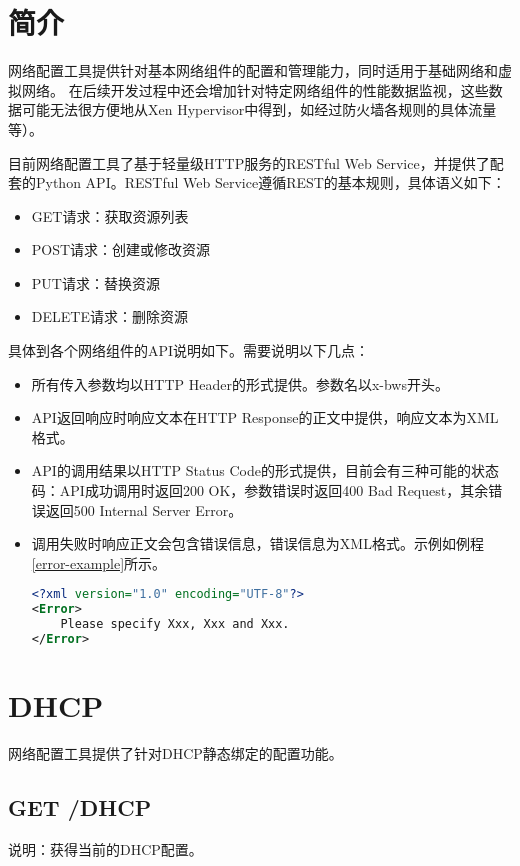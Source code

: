 \section{简介}
网络配置工具提供针对基本网络组件的配置和管理能力，同时适用于基础网络和虚拟网络。
在后续开发过程中还会增加针对特定网络组件的性能数据监视，这些数据可能无法很方便地从Xen Hypervisor中得到，如经过防火墙各规则的具体流量等）。

目前网络配置工具了基于轻量级HTTP服务的RESTful Web Service，并提供了配套的Python API。RESTful Web Service遵循REST的基本规则\cite{fielding2000architectural}，具体语义如下：

\begin{itemize}
\item GET请求：获取资源列表
\item POST请求：创建或修改资源
\item PUT请求：替换资源
\item DELETE请求：删除资源
\end{itemize}

具体到各个网络组件的API说明如下。需要说明以下几点：

\begin{itemize}
\item 所有传入参数均以HTTP Header的形式提供。参数名以x-bws开头。
\item API返回响应时响应文本在HTTP Response的正文中提供，响应文本为XML格式。
\item API的调用结果以HTTP Status Code的形式提供，目前会有三种可能的状态码：API成功调用时返回200 OK，参数错误时返回400 Bad Request，其余错误返回500 Internal Server Error。
\item 调用失败时响应正文会包含错误信息，错误信息为XML格式。示例如例程\ref{error-example}所示。
\begin{lstlisting}[caption=错误信息示例,label=error-example,language=XML]
<?xml version="1.0" encoding="UTF-8"?>
<Error>
	Please specify Xxx, Xxx and Xxx.
</Error>
\end{lstlisting}
\end{itemize}

\section{DHCP}
网络配置工具提供了针对DHCP静态绑定的配置功能。

\subsection{GET /DHCP}
说明：获得当前的DHCP配置。

